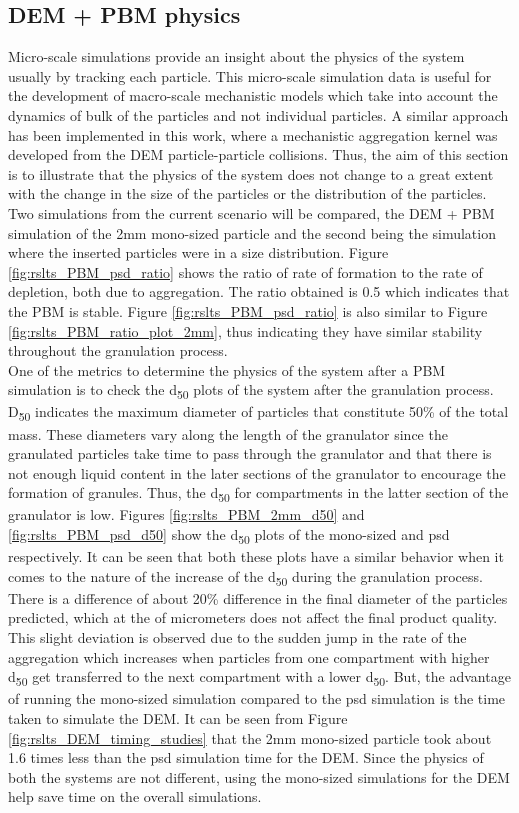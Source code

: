 \documentclass[preprint,11pt,authoryear]{elsarticle}
\begin{document}
\subsection{DEM + PBM physics}
 Micro-scale simulations provide an insight about the physics of the system usually by tracking 
each particle. This micro-scale simulation data is useful for the development of macro-scale 
mechanistic models which take into account the dynamics of bulk of the particles and not individual 
particles. A similar approach has been implemented in this work, where a mechanistic aggregation 
kernel was developed from the DEM particle-particle collisions. Thus, the aim of this section is to 
illustrate that the physics of the system does not change to a great extent with the change in the size 
of the particles or the distribution of the particles.\\
Two simulations from the current scenario will be compared, the DEM + PBM simulation of the 2mm 
mono-sized particle and the second being the simulation where the inserted particles were in a size 
distribution. Figure \ref{fig:rslts_PBM_psd_ratio} shows the ratio of rate of formation to the rate of 
depletion, both due to aggregation. The ratio obtained is 0.5 which indicates that the PBM is stable. 
Figure \ref{fig:rslts_PBM_psd_ratio} is also similar to Figure \ref{fig:rslts_PBM_ratio_plot_2mm}, thus 
indicating they have similar stability throughout the granulation process. \\
One of the metrics to determine the physics of the system after a PBM simulation is to check the 
d\textsubscript{50} plots of the system after the granulation process. D\textsubscript{50} indicates the 
maximum diameter of particles that constitute 50\% of the total mass. These diameters vary along the 
length of the granulator since the granulated particles take time to pass through the granulator and 
that there is not enough liquid content in the later sections of the granulator to encourage the 
formation of granules. Thus, the d\textsubscript{50} for compartments in the latter section of the 
granulator is low. Figures \ref{fig:rslts_PBM_2mm_d50} and \ref{fig:rslts_PBM_psd_d50} show the 
d\textsubscript{50} plots of the mono-sized and psd respectively. It can be seen that both these plots 
have a similar behavior when it comes to the nature of the increase of the d\textsubscript{50} during 
the granulation process. There is a difference of about 20\% difference in the final diameter of the 
particles predicted, which at the of micrometers does not affect the final product quality. This slight 
deviation is observed due to the sudden jump in the rate of the aggregation which increases when 
particles from one compartment with higher d\textsubscript{50} get transferred to the next 
compartment with a lower d\textsubscript{50}. But, the advantage of running the mono-sized 
simulation compared to the psd simulation is the time taken to simulate the DEM. It can be seen from 
Figure \ref{fig:rslts_DEM_timing_studies} that the 2mm mono-sized particle took about 1.6 times less 
than the psd simulation time for the DEM. Since the physics of both the systems are not different, 
using the mono-sized simulations for the DEM help save time on the overall simulations. 
\end{document}
